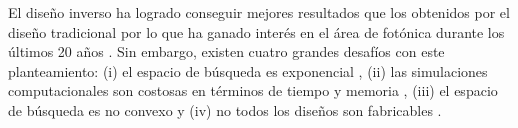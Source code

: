 
El diseño inverso ha logrado conseguir mejores resultados que los obtenidos por el
diseño tradicional por lo que ha ganado interés en el área de fotónica durante
los últimos 20 años \citep{Su2018, Molesky2018, Campbell2019}. 
Sin embargo, existen cuatro grandes desafíos con este planteamiento:
(i) el espacio de búsqueda es exponencial \citep{Vuckovic2019}, 
(ii) las simulaciones computacionales son costosas en términos de tiempo y memoria \citep{Kudyshev2020}, 
(iii) el espacio de búsqueda es no convexo \citep{Su2018} y
(iv) no todos los diseños son fabricables \citep{Su2020}.






